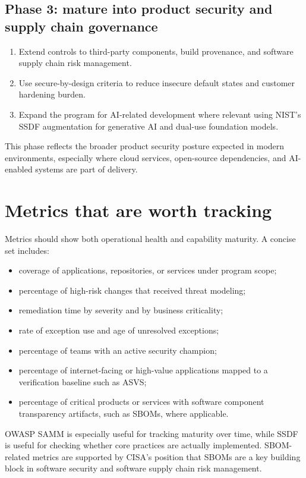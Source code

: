 \documentclass[11pt]{article}
\begin{document}
\subsection{Phase 3: mature into product security and supply chain governance}
\begin{enumerate}
  \item Extend controls to third-party components, build provenance, and software supply chain risk management.
  \item Use secure-by-design criteria to reduce insecure default states and customer hardening burden.
  \item Expand the program for AI-related development where relevant using NIST's SSDF augmentation for generative AI and dual-use foundation models.
\end{enumerate}
This phase reflects the broader product security posture expected in modern environments, especially where cloud services, open-source dependencies, and AI-enabled systems are part of delivery.\cite{cisa-sbd,nist-218a,cisa-sbom,nist-supplychain}

\section{Metrics that are worth tracking}
Metrics should show both operational health and capability maturity. A concise set includes:
\begin{itemize}
  \item coverage of applications, repositories, or services under program scope;
  \item percentage of high-risk changes that received threat modeling;
  \item remediation time by severity and by business criticality;
  \item rate of exception use and age of unresolved exceptions;
  \item percentage of teams with an active security champion;
  \item percentage of internet-facing or high-value applications mapped to a verification baseline such as ASVS;
  \item percentage of critical products or services with software component transparency artifacts, such as SBOMs, where applicable.
\end{itemize}
OWASP SAMM is especially useful for tracking maturity over time, while SSDF is useful for checking whether core practices are actually implemented. SBOM-related metrics are supported by CISA's position that SBOMs are a key building block in software security and software supply chain risk management.\cite{owasp-samm,nist-ssdf,cisa-sbom}
\end{document}
